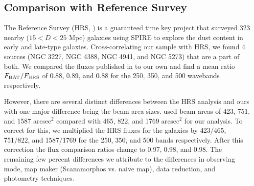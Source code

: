 \subsection{Comparison with \herschel{} Reference Survey}
The \herschel{} Reference Survey (HRS, \citet{Boselli:2010fj}) is a guaranteed time key project that surveyed 323 nearby ($15<D<25$ Mpc) galaxies using SPIRE to explore the dust content in early and late-type galaxies. Cross-correlating our sample with HRS, we found 4 sources (NGC 3227, NGC 4388, NGC 4941, and NGC 5273) that are a part of both. We compared the fluxes published in \citet{Ciesla:2012lq} to our own and find a mean ratio $F_{\rm{BAT}}/F_{\rm{HRS}}$ of 0.88, 0.89, and 0.88 for the 250, 350, and 500 \um{} wavebands respectively. 

However, there are several distinct differences between the HRS analysis and ours with one major difference being the beam area sizes. \citet{Ciesla:2012lq} used beam areas of 423, 751, and 1587 arcsec$^{2}$ compared with 465, 822, and 1769 arcsec$^{2}$ for our analysis. To correct for this, we multiplied the HRS fluxes for the galaxies by 423/465, 751/822, and 1587/1769 for the 250, 350, and 500 \um{} bands respectively.  After this correction the flux comparison ratios change to 0.97, 0.98, and 0.98. The remaining few percent differences we attribute to the differences in observing mode, map maker (Scanamorphos vs. naive map), data reduction, and photometry techniques.